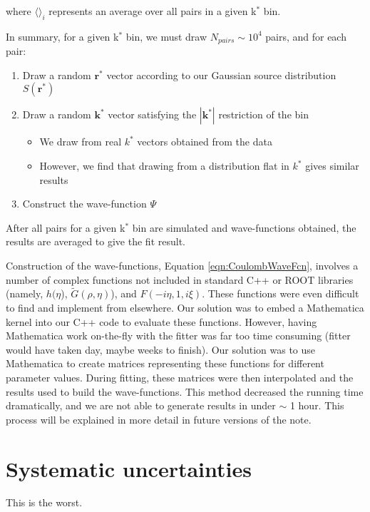 \documentclass[ALICE,manyauthors]{cernphprep}
\begin{document}
where $\langle \rangle_{i}$ represents an average over all pairs in a given k$^{*}$ bin.

In summary, for a given k$^{*}$ bin, we must draw $N_{pairs} \sim 10^{4}$ pairs, and for each pair:

\begin{enumerate}
 \item Draw a random $\mathbf{r}^{*}$ vector according to our Gaussian source distribution $S(\mathbf{r}^{*})$
 \item Draw a random $\mathbf{k}^{*}$ vector satisfying the $|\mathbf{k}^{*}|$ restriction of the bin
 \begin{itemize}
  \item We draw from real $k^{*}$ vectors obtained from the data
  \item However, we find that drawing from a distribution flat in $k^{*}$ gives similar results
 \end{itemize}
 \item Construct the wave-function $\Psi$
\end{enumerate}

After all pairs for a given k$^{*}$ bin are simulated and wave-functions obtained, the results are averaged to give the fit result.

Construction of the wave-functions, Equation \ref{eqn:CoulombWaveFcn}, involves a number of complex functions not included in standard C++ or ROOT libraries (namely, $h(\eta$), $\tilde{G}(\rho,\eta)$), and $F(-i\eta,1,i\xi)$.  These functions were even difficult to find and implement from elsewhere.  Our solution was to embed a Mathematica kernel into our C++ code to evaluate these functions.  However, having Mathematica work on-the-fly with the fitter was far too time consuming (fitter would have taken day, maybe weeks to finish).  Our solution was to use Mathematica to create matrices representing these functions for different parameter values.  During fitting, these matrices were then interpolated and the results used to build the wave-functions.  This method decreased the running time dramatically, and we are not able to generate results in under $\sim$ 1 hour. This process will be explained in more detail in future versions of the note.





\section{Systematic uncertainties}
\label{sec:SysErrs}
This is the worst.
\end{document}
